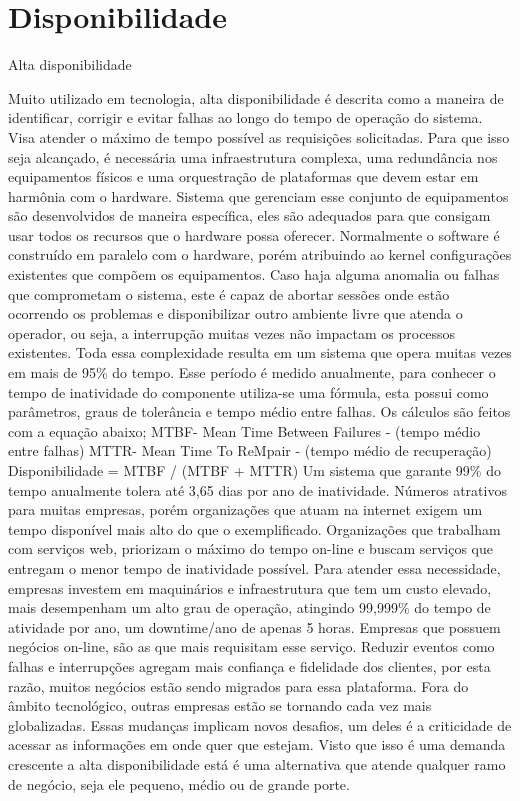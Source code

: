 \chapter{Disponibilidade}

Alta disponibilidade

Muito utilizado em tecnologia, alta disponibilidade é descrita como a maneira de identificar, corrigir e evitar falhas ao longo do tempo de operação do sistema. Visa atender o máximo de tempo possível as requisições solicitadas. Para que isso seja alcançado, é necessária uma infraestrutura complexa, uma redundância nos equipamentos físicos e uma orquestração de plataformas que devem estar em harmônia com o hardware. Sistema que gerenciam esse conjunto de equipamentos são desenvolvidos de maneira específica, eles são adequados para que consigam usar todos os recursos que o hardware possa oferecer. Normalmente o software é construído em paralelo com o hardware, porém atribuindo ao kernel configurações existentes que compõem os equipamentos. Caso haja alguma anomalia ou falhas que comprometam o sistema, este é capaz de abortar sessões onde estão ocorrendo os problemas e disponibilizar outro ambiente livre que atenda o operador, ou seja, a interrupção muitas vezes não impactam os processos existentes.
Toda essa complexidade resulta em um sistema que opera muitas vezes em mais de 95\% do tempo. Esse período é medido anualmente, para conhecer o tempo de inatividade do componente utiliza-se uma fórmula, esta possui como parâmetros, graus de tolerância e tempo médio entre falhas. Os cálculos são feitos com a equação abaixo;
MTBF- Mean Time Between Failures - (tempo médio entre falhas)
MTTR- Mean Time To ReMpair - (tempo médio de recuperação)
Disponibilidade = MTBF / (MTBF + MTTR)
Um sistema que garante 99\% do tempo anualmente tolera até 3,65 dias por ano de inatividade. Números atrativos para muitas empresas, porém organizações que atuam na internet exigem um tempo disponível mais alto do que o exemplificado. Organizações que trabalham com serviços web, priorizam o máximo do tempo on-line e buscam serviços que entregam o menor tempo de inatividade possível. Para atender essa necessidade, empresas investem em maquinários e infraestrutura que tem um custo elevado, mais desempenham um alto grau de operação, atingindo 99,999\% do tempo de atividade por ano, um downtime/ano de apenas 5 horas.
Empresas que possuem negócios on-line, são as que mais requisitam esse serviço. Reduzir eventos como falhas e interrupções agregam mais confiança e fidelidade dos clientes, por esta razão, muitos negócios estão sendo migrados para essa plataforma. Fora do âmbito tecnológico, outras empresas estão se tornando cada vez mais globalizadas. Essas mudanças implicam novos desafios, um deles é a criticidade de acessar as informações em onde quer que estejam. Visto que isso é uma demanda crescente a alta disponibilidade está é uma alternativa que atende qualquer ramo de negócio, seja ele pequeno, médio ou de grande porte.
